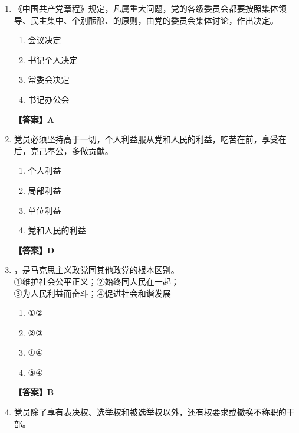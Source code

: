 \documentclass[UTF8,11pt,a4paper]{ctexart}
\begin{document}
\begin{enumerate}[label=\textbf{\arabic*.}, leftmargin=2.5em, itemsep=0.7em]
\begin{enumerate}[label=\Alph*., leftmargin=2em, itemsep=0.1em, topsep=0.15em]
\item 委员服从党委书记
\item 少数服从多数
\item 普通党员服从党组织书记
\item 以上都不是
\end{enumerate}
\textbf{【答案】B}
\item 《中国共产党章程》规定，凡属重大问题，党的各级委员会都要按照集体领导、民主集中、个别酝酿、\allowbreak\underline{\hspace{4em}}的原则，由党的委员会集体讨论，作出决定。
\begin{enumerate}[label=\Alph*., leftmargin=2em, itemsep=0.1em, topsep=0.15em]
\item 会议决定
\item 书记个人决定
\item 常委会决定
\item 书记办公会
\end{enumerate}
\textbf{【答案】A}
\item 党员必须坚持\allowbreak\underline{\hspace{4em}}高于一切，个人利益服从党和人民的利益，吃苦在前，享受在后，克己奉公，多做贡献。
\begin{enumerate}[label=\Alph*., leftmargin=2em, itemsep=0.1em, topsep=0.15em]
\item 个人利益
\item 局部利益
\item 单位利益
\item 党和人民的利益
\end{enumerate}
\textbf{【答案】D}
\item \allowbreak\underline{\hspace{4em}}，是马克思主义政党同其他政党的根本区别。\\ ①维护社会公平正义；②始终同人民在一起；\\ ③为人民利益而奋斗；④促进社会和谐发展
\begin{enumerate}[label=\Alph*., leftmargin=2em, itemsep=0.1em, topsep=0.15em]
\item ①②
\item ②③
\item ①④
\item ③④
\end{enumerate}
\textbf{【答案】B}
\item 党员除了享有表决权、选举权和被选举权以外，还有权要求\allowbreak\underline{\hspace{4em}}或撤换不称职的干部。
\begin{enumerate}[label=\Alph*., leftmargin=2em, itemsep=0.1em, topsep=0.15em]

\end{enumerate}
\end{enumerate}
\end{document}
